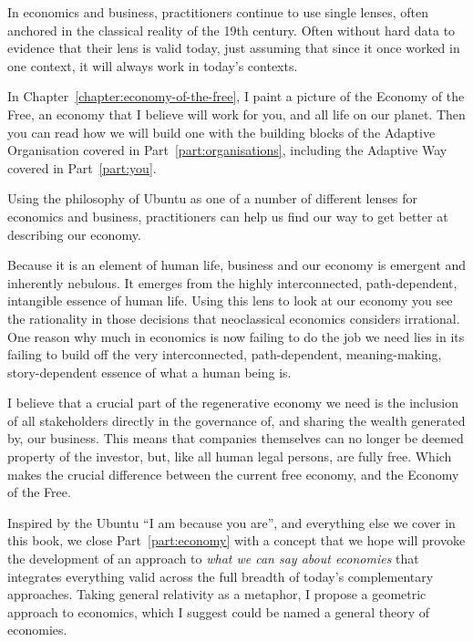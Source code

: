 In economics and business, practitioners continue to use single lenses, often anchored in the classical reality of the 19th century. Often without hard data to evidence that their lens is valid today, just assuming that since it once worked in one context, it will always work in today's contexts. 


In Chapter~\ref{chapter:economy-of-the-free}, I paint a picture of the Economy of the Free, an economy that I believe will work for you, and all life on our planet. Then you can read how we will build one with the building blocks of the Adaptive Organisation covered in Part~\ref{part:organisations}, including the Adaptive Way covered in Part~\ref{part:you}. 
 
Using the philosophy of Ubuntu as one of a number of different lenses for economics and business, practitioners can help us find our way to get better at describing our economy. 


Because it is an element of human life, business and our economy is emergent and inherently nebulous. It emerges from the highly interconnected, path-dependent, intangible essence of human life. Using this lens to look at our economy you see the rationality in those decisions that neoclassical economics considers irrational. One reason why much in economics is now failing to do the job we need lies in its failing to build off the very interconnected, path-dependent, meaning\hyp{}making, story-dependent essence of what a human being is. 


I believe that a crucial part of the regenerative economy we need is the inclusion of all stakeholders directly in the governance of, and sharing the wealth generated by, our business. This means that companies themselves can no longer be deemed property of the investor, but, like all human legal persons, are fully free. Which makes the crucial difference between the current free economy, and the Economy of the Free.


Inspired by the Ubuntu “I am because you are”, and everything else we cover in this book, we close Part~\ref{part:economy} with a concept that we hope will provoke the development of an approach to \emph{what we can say about economies} that integrates everything valid across the full breadth of today's complementary approaches. Taking general relativity as a metaphor, I propose a geometric approach to economics, which I suggest could be named a general theory of economies.


